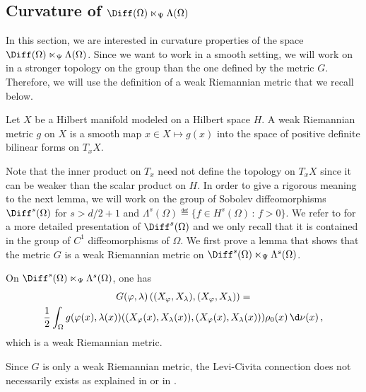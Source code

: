 \subsection{Curvature of $\Diff(\Omega) \ltimes_\Psi \Lambda(\Omega)$}
In this section, we are interested in curvature properties of the space $\Diff(\Omega) \ltimes_\Psi \Lambda(\Omega)$. %
Since we want to work in a smooth setting, we will work on in a stronger topology on the group than the one defined by the metric $G$. Therefore, we will use the definition of a weak Riemannian metric \cite[Section 9]{em70} that we recall below.
\begin{definition}
Let $X$ be a Hilbert manifold modeled on a Hilbert space $H$. A weak Riemannian metric $g$ on $X$ is a smooth map $x \in X \mapsto g(x)$ into the space of positive definite bilinear forms on $T_xX$.
\end{definition}
Note that  the inner product on $T_x$ need not define the topology on $T_xX$ since it can be weaker than the scalar product on $H$.
In order to give a rigorous meaning to the next lemma, we will work on the group of Sobolev diffeomorphisms $\Diff^{s}(\Omega)$ for $s> d/2+1$ and $\Lambda^s(\Omega) \eqdef \{  f \in H^s(\Omega) \, : \, f > 0\}$. We refer to \cite{BruverisVialard} for a more detailed presentation of $\Diff^{s}(\Omega)$ and we only recall that it is contained in the group of $C^1$ diffeomorphisms of $\Omega$. 
We first prove a lemma that shows that the metric $G$ is a weak Riemannian metric on $\Diff^{s}(\Omega) \ltimes_\Psi \Lambda^s(\Omega)$. %
\begin{lemma}\label{L2Norm}
On $\Diff^{s}(\Omega) \ltimes_\Psi \Lambda^s(\Omega)$, one has
\begin{multline}\label{SimplifiedG}
G(\varphi,\lambda)\left((X_\varphi,X_\lambda) , (X_\varphi,X_\lambda)\right) = \\ \frac{1}{2} \int_{\Omega} g(\varphi(x),\lambda(x))((X_\varphi(x),X_\lambda(x)),(X_\varphi(x),X_\lambda(x)))  \rho_0(x) \, \d \nu(x) \,,
\end{multline}
which is a weak Riemannian metric.
\end{lemma}

\begin{remark} Since $G$ is only a weak Riemannian metric, the Levi-Civita connection does not necessarily exists as explained in \cite{em70} or in \cite{SobolevMetricsCurvature}. 
\end{remark}


